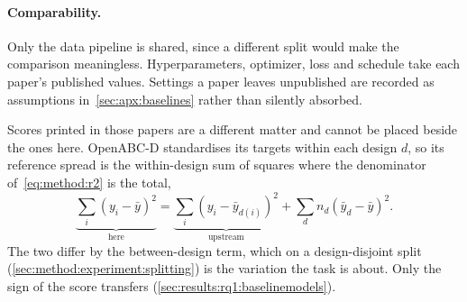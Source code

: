 \paragraph{Comparability.}
Only the data pipeline is shared, since a different split would make the comparison
meaningless. Hyperparameters, optimizer, loss and schedule take each paper's published
values. Settings a paper leaves unpublished are recorded as assumptions
in~\ref{sec:apx:baselines} rather than silently absorbed.

Scores printed in those papers are a different matter and cannot be placed beside the ones
here. OpenABC-D standardises its targets within each design $d$, so its reference spread is
the within-design sum of squares where the denominator of~\eqref{eq:method:r2} is the total,
\begin{equation}
    \underbrace{\sum_{i} \left( y_i - \bar{y} \right)^{2}}_{\text{here}}
    = \underbrace{\sum_{i} \left( y_i - \bar{y}_{d(i)} \right)^{2}}_{\text{upstream}}
    + \sum_{d} n_d \left( \bar{y}_{d} - \bar{y} \right)^{2}.
    \label{eq:method:r2-decomposition}
\end{equation}
The two differ by the between-design term, which on a design-disjoint split
(\ref{sec:method:experiment:splitting}) is the variation the task is about. Only the sign
of the score transfers (\ref{sec:results:rq1:baselinemodels}).
